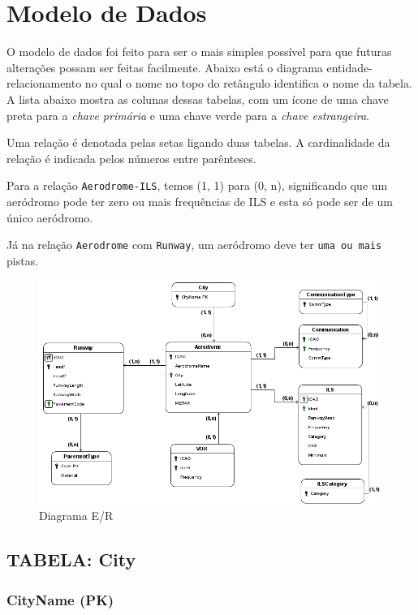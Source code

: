 \chapter{Modelo de Dados}

O modelo de dados foi feito para ser o mais simples possível para que futuras alterações
possam ser feitas facilmente. Abaixo está o diagrama entidade-relacionamento no qual
o nome no topo do retângulo identifica o nome da tabela. A lista abaixo mostra
as colunas dessas tabelas, com um ícone de uma chave preta para a \textit{chave primária} e 
uma chave verde para a \textit{chave estrangeira}.

Uma relação é denotada pelas setas ligando duas tabelas. A cardinalidade da relação é indicada
pelos números entre parênteses. 

Para a relação \texttt{Aerodrome-ILS}, temos (1, 1) para (0, n), significando que um aeródromo pode
ter zero ou mais frequências de ILS e esta só pode ser de um único aeródromo.

Já na relação \texttt{Aerodrome} com \texttt{Runway}, um aeródromo deve ter \texttt{uma ou mais} pistas.


\begin{figure}[ht]
    \begin{center}
    \includegraphics[width=400pt]{img/ERAero.png}
    \caption{Diagrama E/R}
    \label{fig:diagrama-er}
    \end{center}
\end{figure}

\section{TABELA: City}
\subsection{CityName (PK)}

